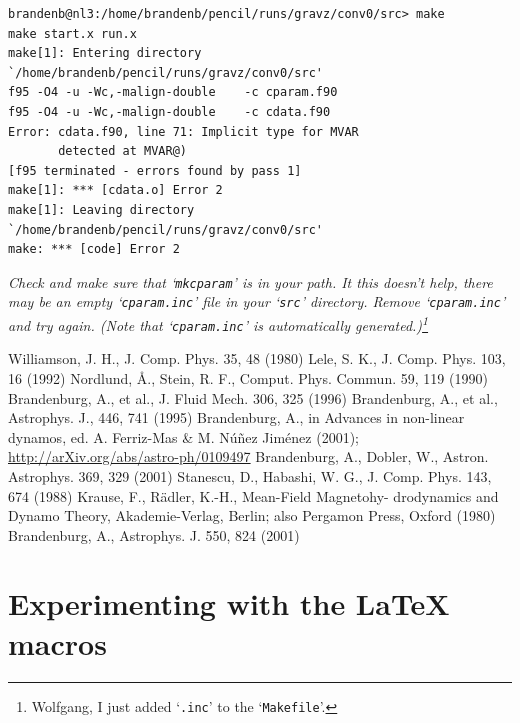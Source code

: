 \documentclass[12pt,twoside,notitlepage,a4paper]{article}
\newcommand{\file}[1]{`\texttt{#1}'}
\begin{document}
\begin{description}
{    \begin{Verbatim}
brandenb@nl3:/home/brandenb/pencil/runs/gravz/conv0/src> make
make start.x run.x
make[1]: Entering directory `/home/brandenb/pencil/runs/gravz/conv0/src'
f95 -O4 -u -Wc,-malign-double    -c cparam.f90
f95 -O4 -u -Wc,-malign-double    -c cdata.f90
Error: cdata.f90, line 71: Implicit type for MVAR
       detected at MVAR@)
[f95 terminated - errors found by pass 1]
make[1]: *** [cdata.o] Error 2
make[1]: Leaving directory `/home/brandenb/pencil/runs/gravz/conv0/src'
make: *** [code] Error 2
    \end{Verbatim}
    }
    \medskip

    {\em
Check and make sure that \file{mkcparam} is in your path.
It this doesn't help, there may be an {\it empty} \file{cparam.inc}
file in your \file{src} directory. Remove \file{cparam.inc} and try again.
(Note that \file{cparam.inc} is automatically generated.)\footnote{Wolfgang,
I just added \file{\rm *.inc} to the \file{Makefile}.}
    }

\end{description}



\begin{thebibliography}{9}

 Williamson, J. H., J. Comp. Phys. 35, 48 (1980)
 Lele, S. K., J. Comp. Phys. 103, 16 (1992)
 Nordlund, \AA., Stein, R. F., Comput. Phys. Commun. 59, 119 (1990)
 Brandenburg, A., et al., J. Fluid Mech. 306, 325 (1996)
 Brandenburg, A., et al., Astrophys. J., 446, 741 (1995)
 Brandenburg, A., in Advances in non-linear dynamos,
ed. A. Ferriz-Mas \& M. N\'u\~nez Jim\'enez (2001);
\url{http://arXiv.org/abs/astro-ph/0109497}
 Brandenburg, A., Dobler, W., Astron. Astrophys. 369, 329 (2001)
 Stanescu, D., Habashi, W. G., J. Comp. Phys. 143, 674 (1988)
 Krause, F., R\"adler, K.-H., Mean-Field
Magneto\-hy- dro\-dy\-na\-mics and Dynamo Theory,
Akademie-Verlag, Berlin; also Pergamon Press, Oxford (1980)
 Brandenburg, A., Astrophys. J. 550, 824 (2001)

\end{thebibliography}



\section*{Experimenting with the \LaTeX{} macros}
\end{document}
